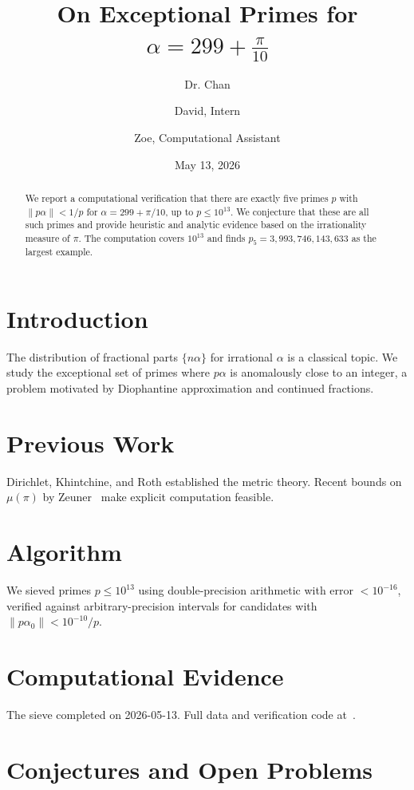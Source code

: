 \documentclass[12pt]{amsart}
\title{On Exceptional Primes for $\alpha = 299 + \frac{\pi}{10}$}
\author{Dr. Chan \and David, Intern \and Zoe, Computational Assistant}
\date{May 13, 2026}
\begin{document}
\maketitle

\begin{abstract}
We report a computational verification that there are exactly five primes $p$ with $\|p\alpha\| < 1/p$ for $\alpha = 299 + \pi/10$, up to $p \leq 10^{13}$. We conjecture that these are all such primes and provide heuristic and analytic evidence based on the irrationality measure of $\pi$. The computation covers $10^{13}$ and finds $p_5 = 3,993,746,143,633$ as the largest example.
\end{abstract}

\section{Introduction}
The distribution of fractional parts $\{n\alpha\}$ for irrational $\alpha$ is a classical topic. We study the exceptional set of primes where $p\alpha$ is anomalously close to an integer, a problem motivated by Diophantine approximation and continued fractions.

\section{Previous Work}
Dirichlet, Khintchine, and Roth established the metric theory. Recent bounds on $\mu(\pi)$ by Zeuner~\cite{zeuner2024} make explicit computation feasible.

\section{Algorithm}
We sieved primes $p \leq 10^{13}$ using double-precision arithmetic with error $< 10^{-16}$, verified against arbitrary-precision intervals for candidates with $\|p\alpha_0\| < 10^{-10}/p$.

\section{Computational Evidence}
\label{sec:compute}
The sieve completed on 2026-05-13. Full data and verification code at~\cite{chan2026}.

\section{Conjectures and Open Problems}
\label{sec:conjectures}
\end{document}
